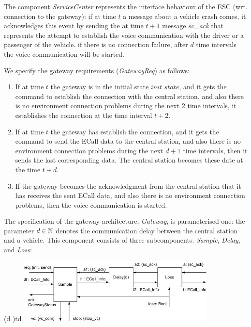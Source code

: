 The component \emph{ServiceCenter} represents the interface behaviour of the ESC 
(wrt. connection to the gateway): 
if at time $t$ a message about a vehicle crash comes, it acknowledges this event by sending 
the at time $t+1$ message \emph{sc\_ack} that represents the 
attempt to establish the voice communication with the driver or a passenger of the vehicle. 
if there is no connection failure, after $d$ time intervals the voice communication will be started. 

We specify the gateway requirements (\emph{GatewayReq}) as follows: 
  \begin{enumerate}
  \item 
  If at time $t$ the gateway is in the initial state $init\_state$, and it gets 
  the command to establish the connection with the central station, and also there is no 
  environment connection problems during the next 2 time intervals, 
  it establishes the connection at the time interval $t+2$. 
  \item 
  If at time $t$  the gateway has establish the connection, 
  and it gets the command to send the ECall data to the central station, and also there is no 
  environment connection problems during the next $d+1$ time intervals, 
  then it sends the last corresponding data. 
        The central station becomes these date at the time $t+d$.
  \item 
  If the gateway becomes the acknowledgment from the central station 
  that it has receives the sent ECall data, and also there is no 
  environment connection problems, then the voice communication is started.
  \end{enumerate}
 The specification of the gateway architecture, \emph{Gateway}, is parameterised one: 
the parameter $d \in {\mathbb N}$ denotes the communication delay 
between the central station and a vehicle. 
This component consists of three subcomponents: \emph{Sample}, \emph{Delay}, 
and \emph{Loss}: 
 
\begin{spec}{(\nconst d \in \Nat)}{td}
\centering \includegraphics[width=10cm]{fig/gateway.jpg}
\end{spec} 
  
